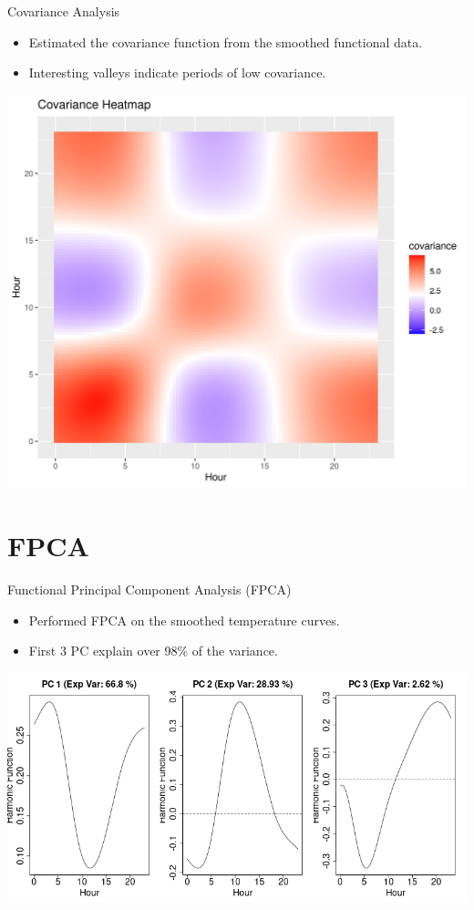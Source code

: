 \documentclass[svgnames, 12pt]{beamer}
\begin{document}
\begin{frame}{Covariance Analysis}
		\begin{itemize}
		\item Estimated the covariance function from the smoothed functional data.
		\item Interesting valleys indicate periods of low covariance.
	\end{itemize}
	\begin{center}
		\includegraphics[width=0.6\linewidth]{../notebooks/assets/covariance_heatmap.png}
	\end{center}
\end{frame}

\section{FPCA}

\begin{frame}{Functional Principal Component Analysis (FPCA)}
	\begin{itemize}
		\item Performed FPCA on the smoothed temperature curves.
		\item First 3 PC explain over 98\% of the variance.
	\end{itemize}
	\begin{center}
		\includegraphics[width=0.8\linewidth]{../notebooks/assets/pca_scree_plot.png}
	\end{center}
\end{frame}
\end{document}
